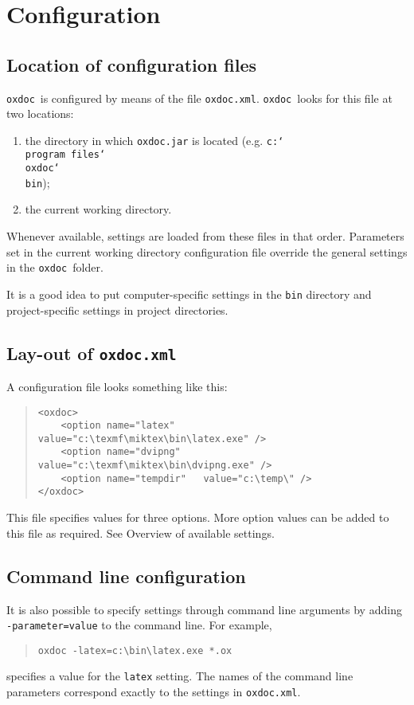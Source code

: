 \documentclass[11pt]{article}
\newcommand\oxdoc{{\tt oxdoc}}
\newcommand\oxdocxml{{\tt oxdoc.xml}}
\newcommand\dvipng{{\tt dvipng}}
\newcommand\bs{{\tt\char`\\}}
\begin{document}
\newpage\section{Configuration}

\subsection{Location of configuration files}
\oxdoc~is configured by means of the file \oxdocxml.
\oxdoc~looks for this file at two locations:
\begin{enumerate}
\item the directory in which {\tt oxdoc.jar}
is located (e.g. {\tt c:\bs program files\bs oxdoc\bs bin});
\item the current working directory.
\end{enumerate}

Whenever available, settings are loaded from these files in that order.
Parameters set in the current working directory configuration file override
the general settings in the \oxdoc~folder.

It is a good idea to put computer-specific settings in the {\tt bin}
directory and project-specific settings in project directories. 

\subsection{Lay-out of \oxdocxml}
A configuration file looks something like this:

\begin{quote}
\small\begin{verbatim}
<oxdoc>
	<option name="latex"     value="c:\texmf\miktex\bin\latex.exe" />
	<option name="dvipng"    value="c:\texmf\miktex\bin\dvipng.exe" />
	<option name="tempdir"   value="c:\temp\" />
</oxdoc>
\end{verbatim}
\end{quote}

This file specifies values for three options. More option values can be added to
this file as required. See Overview of available settings.

\subsection{Command line configuration}
It is also possible to specify settings through command line arguments
by adding {\tt -parameter=value} to the command line. 
For example,
\begin{quote}
\small\begin{verbatim}
oxdoc -latex=c:\bin\latex.exe *.ox
\end{verbatim}
\end{quote}
specifies a value for the {\tt latex} setting. The names of the
command line parameters correspond exactly to the settings in 
\oxdocxml.
\end{document}
